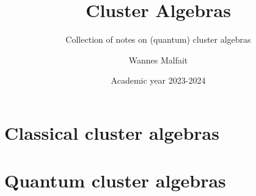 \documentclass{article}
\title{Cluster Algebras}
\subtitle{Collection of notes on (quantum) cluster algebras}
\author{Wannes Malfait}
\date{Academic year 2023-2024}
\begin{document}
\maketitle
\newpage
\tableofcontents
\newpage

\section{Classical cluster algebras}


\section{Quantum cluster algebras}


\newpage


\printindex
\end{document}
